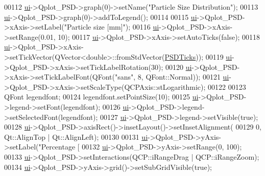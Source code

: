 \begin{DoxyCode}
00112   \hyperlink{class_v_s_a_main_window_a958a0581d2bf1bfe020c3b5d8f738640}{ui}->Qplot\_PSD->graph(0)->setName(\textcolor{stringliteral}{"Particle Size Distribution"});
00113   \hyperlink{class_v_s_a_main_window_a958a0581d2bf1bfe020c3b5d8f738640}{ui}->Qplot\_PSD->graph(0)->addToLegend();
00114 
00115   \hyperlink{class_v_s_a_main_window_a958a0581d2bf1bfe020c3b5d8f738640}{ui}->Qplot\_PSD->xAxis->setLabel(\textcolor{stringliteral}{"Particle size [mm]"});
00116   \hyperlink{class_v_s_a_main_window_a958a0581d2bf1bfe020c3b5d8f738640}{ui}->Qplot\_PSD->xAxis->setRange(0.01, 10);
00117   \hyperlink{class_v_s_a_main_window_a958a0581d2bf1bfe020c3b5d8f738640}{ui}->Qplot\_PSD->xAxis->setAutoTicks(\textcolor{keyword}{false});
00118   \hyperlink{class_v_s_a_main_window_a958a0581d2bf1bfe020c3b5d8f738640}{ui}->Qplot\_PSD->xAxis->setTickVector(QVector<double>::fromStdVector(\hyperlink{class_v_s_a_main_window_a43651d26dd4d6d8971317d902294317c}{PSDTicks}));
00119   \hyperlink{class_v_s_a_main_window_a958a0581d2bf1bfe020c3b5d8f738640}{ui}->Qplot\_PSD->xAxis->setTickLabelRotation(30);
00120   \hyperlink{class_v_s_a_main_window_a958a0581d2bf1bfe020c3b5d8f738640}{ui}->Qplot\_PSD->xAxis->setTickLabelFont(QFont(\textcolor{stringliteral}{"sans"}, 8, QFont::Normal));
00121   \hyperlink{class_v_s_a_main_window_a958a0581d2bf1bfe020c3b5d8f738640}{ui}->Qplot\_PSD->xAxis->setScaleType(QCPAxis::stLogarithmic);
00122 
00123   QFont legendfont;
00124   legendfont.setPointSize(10);
00125   \hyperlink{class_v_s_a_main_window_a958a0581d2bf1bfe020c3b5d8f738640}{ui}->Qplot\_PSD->legend->setFont(legendfont);
00126   \hyperlink{class_v_s_a_main_window_a958a0581d2bf1bfe020c3b5d8f738640}{ui}->Qplot\_PSD->legend->setSelectedFont(legendfont);
00127   \hyperlink{class_v_s_a_main_window_a958a0581d2bf1bfe020c3b5d8f738640}{ui}->Qplot\_PSD->legend->setVisible(\textcolor{keyword}{true});
00128   \hyperlink{class_v_s_a_main_window_a958a0581d2bf1bfe020c3b5d8f738640}{ui}->Qplot\_PSD->axisRect()->insetLayout()->setInsetAlignment(
00129       0, Qt::AlignTop | Qt::AlignLeft);
00130 
00131   \hyperlink{class_v_s_a_main_window_a958a0581d2bf1bfe020c3b5d8f738640}{ui}->Qplot\_PSD->yAxis->setLabel(\textcolor{stringliteral}{"Percentage [%
00132   \hyperlink{class_v_s_a_main_window_a958a0581d2bf1bfe020c3b5d8f738640}{ui}->Qplot\_PSD->yAxis->setRange(0, 100);
00133   \hyperlink{class_v_s_a_main_window_a958a0581d2bf1bfe020c3b5d8f738640}{ui}->Qplot\_PSD->setInteractions(QCP::iRangeDrag | QCP::iRangeZoom);
00134   \hyperlink{class_v_s_a_main_window_a958a0581d2bf1bfe020c3b5d8f738640}{ui}->Qplot\_PSD->yAxis->grid()->setSubGridVisible(\textcolor{keyword}{true});
}
\end{DoxyCode}
